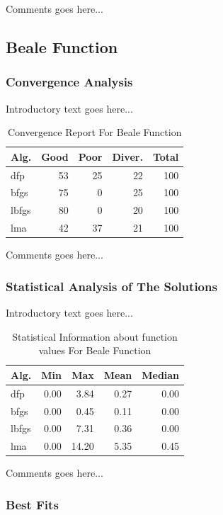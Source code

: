 \documentclass{ieeeaccess}
\begin{document}
Comments goes here...
\subsection{Beale Function}
\label{beale2D}

\subsubsection{Convergence Analysis}
\label{convergencebeale2D}


Introductory text goes here...
\begin{table}
\centering
\caption{Convergence Report For Beale Function}
\label{convergence:beale}
\begin{tabular}{lrrrr}
\toprule
 Alg. &  Good &  Poor &  Diver. &  Total \\
\midrule
  dfp &    53 &    25 &      22 &    100 \\
 bfgs &    75 &     0 &      25 &    100 \\
lbfgs &    80 &     0 &      20 &    100 \\
  lma &    42 &    37 &      21 &    100 \\
\bottomrule
\end{tabular}
\end{table}


Comments goes here...
\subsubsection{Statistical Analysis of The Solutions}
\label{statisticalanalysisbeale2D}


Introductory text goes here...
\begin{table}
\centering
\caption{Statistical Information about function values For Beale Function}
\label{function_values:beale}
\begin{tabular}{lrrrr}
\toprule
 Alg. &  Min &   Max &  Mean &  Median \\
\midrule
  dfp & 0.00 &  3.84 &  0.27 &    0.00 \\
 bfgs & 0.00 &  0.45 &  0.11 &    0.00 \\
lbfgs & 0.00 &  7.31 &  0.36 &    0.00 \\
  lma & 0.00 & 14.20 &  5.35 &    0.45 \\
\bottomrule
\end{tabular}
\end{table}


Comments goes here...
\subsubsection{Best Fits}
\label{bestfitsbeale2D}
\end{document}
